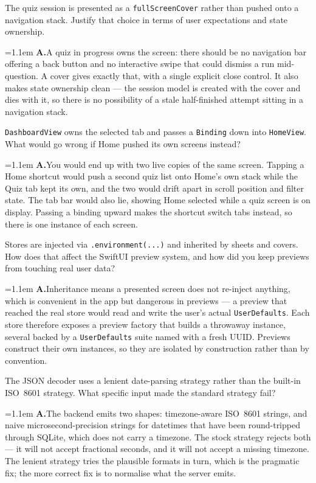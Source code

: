 \documentclass[11pt,a4paper]{article}
\newcommand{\code}[1]{\texttt{\small #1}}
\newcommand{\ans}[1]{%
  \par\vspace{0.32em}%
  \begingroup
  \small\color{answerink}%
  \leftskip=1.1em
  \noindent\textbf{\color{accent}A.}\hspace{0.45em}#1\par
  \endgroup
  \vspace{0.1em}%
}
\begin{document}
\begin{questions}[resume]
\item The quiz session is presented as a \code{fullScreenCover} rather than pushed
onto a navigation stack. Justify that choice in terms of user expectations and
state ownership.
\ans{A quiz in progress owns the screen: there should be no navigation bar
offering a back button and no interactive swipe that could dismiss a run
mid-question. A cover gives exactly that, with a single explicit close control.
It also makes state ownership clean --- the session model is created with the
cover and dies with it, so there is no possibility of a stale half-finished
attempt sitting in a navigation stack.}

\item \code{DashboardView} owns the selected tab and passes a \code{Binding} down
into \code{HomeView}. What would go wrong if Home pushed its own screens instead?
\ans{You would end up with two live copies of the same screen. Tapping a Home
shortcut would push a second quiz list onto Home's own stack while the Quiz tab
kept its own, and the two would drift apart in scroll position and filter state.
The tab bar would also lie, showing Home selected while a quiz screen is on
display. Passing a binding upward makes the shortcut switch tabs instead, so
there is one instance of each screen.}

\item Stores are injected via \code{.environment(...)} and inherited by sheets and
covers. How does that affect the SwiftUI preview system, and how did you keep
previews from touching real user data?
\ans{Inheritance means a presented screen does not re-inject anything, which is
convenient in the app but dangerous in previews --- a preview that reached the
real store would read and write the user's actual \code{UserDefaults}. Each store
therefore exposes a preview factory that builds a throwaway instance, several
backed by a \code{UserDefaults} suite named with a fresh UUID. Previews construct
their own instances, so they are isolated by construction rather than by
convention.}

\item The JSON decoder uses a lenient date-parsing strategy rather than the
built-in ISO~8601 strategy. What specific input made the standard strategy fail?
\ans{The backend emits two shapes: timezone-aware ISO~8601 strings, and naive
microsecond-precision strings for datetimes that have been round-tripped through
SQLite, which does not carry a timezone. The stock strategy rejects both --- it
will not accept fractional seconds, and it will not accept a missing timezone.
The lenient strategy tries the plausible formats in turn, which is the pragmatic
fix; the more correct fix is to normalise what the server emits.}

\end{questions}
\end{document}
